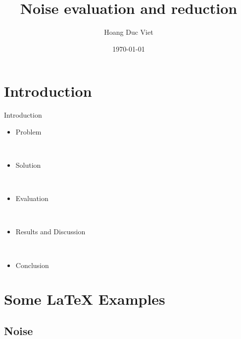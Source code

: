 \documentclass{beamer}
\title[Your Short Title]{Noise evaluation and reduction}
\author{Hoang Duc Viet}
\institute{ICT Lab}
\date{\today}
\begin{document}
\begin{frame}
  \titlepage
\end{frame}


\section{Introduction}

\begin{frame}{Introduction}


\begin{itemize}
  \item Problem
  
  \
  
  \item Solution
  
  \
  
  \item Evaluation
  
  \
  
  \item Results and Discussion

\
 
  \item Conclusion
\end{itemize}



\end{frame}

\section{Some \LaTeX{} Examples}

\subsection{Noise}
\end{document}
